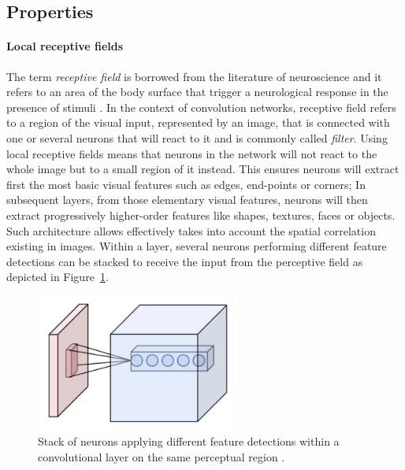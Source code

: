\subsection{Properties}
\label{sub:concepts:convnets:properties}

\paragraph{Local receptive fields}
The term \emph{receptive field} is borrowed from the literature of neuroscience and it refers to an area of the body surface that trigger a neurological response in the presence of stimuli \cite{Sherrington1906,Alonso2008}.
In the context of convolution networks, receptive field refers to a region of the visual input, represented by an image, that is connected with one or several neurons that will react to it and is commonly called \emph{filter}.
Using local receptive fields means that neurons in the network will not react to the whole image but to a small region of it instead.
This ensures neurons will extract first the most basic visual features such as edges, end-points or corners;
In subsequent layers, from those elementary visual features, neurons will then extract progressively higher-order features like shapes, textures, faces or objects.
Such architecture allows effectively takes into account the spatial correlation existing in images.
Within a layer, several neurons performing different feature detections can be stacked to receive the input from the perceptive field as depicted in Figure~\ref{fig:sec:theory:conv-layer-1}.

\begin{figure}[htb]
  \begin{center}
    \includegraphics[width=0.6\textwidth]{gfx/conv-layer-1}
  \end{center}
  \caption{Stack of neurons applying different feature detections within a convolutional layer on the same perceptual region \cite{Aphex342015}.}
  \label{fig:sec:theory:conv-layer-1}
\end{figure}

